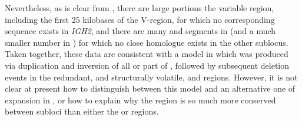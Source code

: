 Nevertheless, as is clear from , there are large portions the  variable region, including the first 25 kilobases of the V-region, for which no corresponding sequence exists in \textit{IGH2}, and there are many \vh and \dh segments in  (and a much smaller number in ) for which no close homologue exists in the other sublocus. Taken together, these data are consistent with a model in which  was produced via duplication and inversion of all or part of , followed by subsequent deletion events in the redundant, and structurally volatile,  \vh and \dh regions. However, it is not clear at present how to distinguish between this model and an alternative one of expansion in , or how to explain why the \jh region is so much more conserved between subloci than either the \vh or \jh regions.

